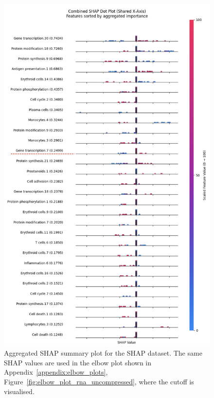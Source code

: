 \documentclass[12pt,a4paper]{report}
\begin{document}
\begin{figure}[h!]
    \centering
    \includegraphics[width=0.85\linewidth]{images/Aggregated_SHAP_RNA_uncompressed.png}
    \caption[Aggregated SHAP plot for SHAP]{Aggregated SHAP summary plot for the SHAP dataset. The same SHAP values are used in the elbow plot shown in Appendix~\ref{appendix:elbow_plots}, Figure~\ref{fig:elbow_plot_rna_uncompressed}, where the cutoff is visualised.}
    \label{fig:rna_aggregated_shap} 
\end{figure}
\end{document}
